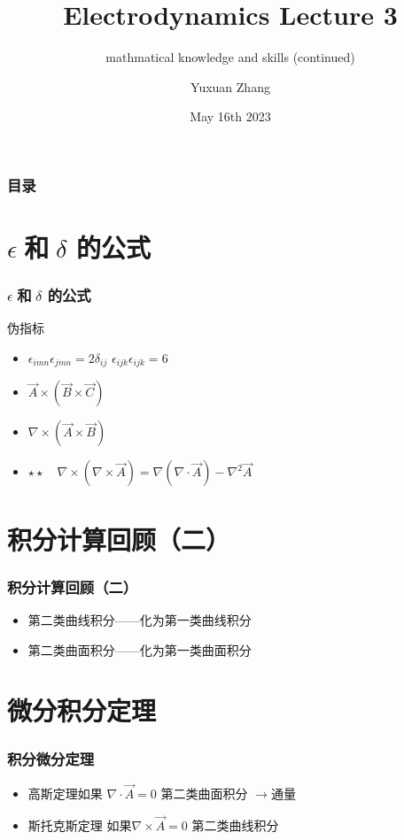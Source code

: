 \documentclass[10pt]{beamer}
\title[About Beamer] %
{Electrodynamics Lecture 3}
\subtitle{mathmatical knowledge and skills (continued)}
\author %
{Yuxuan Zhang }
\institute[VFU] %
{
  School of Physics \quad
  Zhejiang University
}
\date[VLC 2021] %
{May 16th 2023}
\begin{document}
\frame{\titlepage}

\begin{frame}
    \frametitle{目录}
    \tableofcontents
\end{frame}

\section{$\epsilon\; $和$\; \delta$ 的公式}
\begin{frame}
    \frametitle{$\epsilon\; $和$\; \delta$ 的公式}
    伪指标
    \begin{itemize}
    \item  $\epsilon_{imn} \epsilon_{jmn} = 2\delta_{ij}$ \quad $\epsilon_{ijk}\epsilon_{ijk} = 6$
    \item $\vec{A} \times (\vec{B} \times \vec{C} ) $
    \item $\nabla \times (\vec{A} \times \vec{B})$
    \item $\star \star \quad \nabla \times (\nabla \times \vec{A}) = \nabla (\nabla\cdot \vec{A}) - \nabla^2 \vec{A}$ 
    \end{itemize}

\end{frame}

\section{积分计算回顾（二）}
\begin{frame}
    \frametitle{积分计算回顾（二）}
    \begin{itemize}
    \item 第二类曲线积分——化为第一类曲线积分
    \item 第二类曲面积分——化为第一类曲面积分
    \end{itemize}
\end{frame}

\section{微分积分定理}
\begin{frame}
  \frametitle{积分微分定理}
  \begin{itemize}
      \item 高斯定理\quad 如果 $\nabla \cdot \vec{A} = 0$  第二类曲面积分 $\rightarrow$通量
      \item 斯托克斯定理 \quad 如果$\nabla \times \vec{A} = 0 $ \quad 第二类曲线积分
  \end{itemize}
\end{frame}
\end{document}
